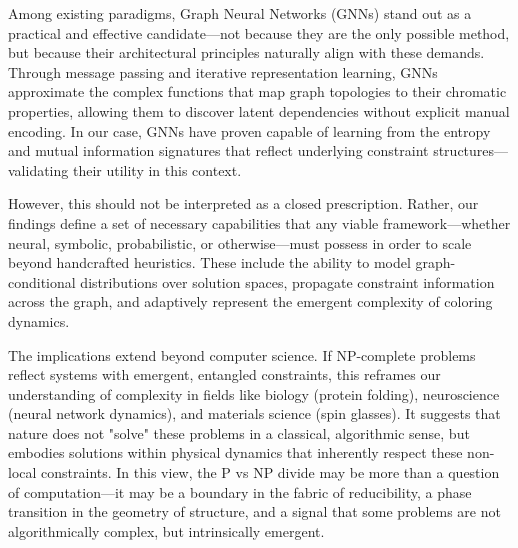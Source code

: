 \documentclass[12pt, letterpaper]{article}
\begin{document}
Among existing paradigms, Graph Neural Networks (GNNs) stand out as a practical and effective candidate—not because they are the only possible method, but because their architectural principles naturally align with these demands. Through message passing and iterative representation learning, GNNs approximate the complex functions that map graph topologies to their chromatic properties, allowing them to discover latent dependencies without explicit manual encoding. In our case, GNNs have proven capable of learning from the entropy and mutual information signatures that reflect underlying constraint structures—validating their utility in this context.

However, this should not be interpreted as a closed prescription. Rather, our findings define a set of necessary capabilities that any viable framework—whether neural, symbolic, probabilistic, or otherwise—must possess in order to scale beyond handcrafted heuristics. These include the ability to model graph-conditional distributions over solution spaces, propagate constraint information across the graph, and adaptively represent the emergent complexity of coloring dynamics.

The implications extend beyond computer science. If NP-complete problems reflect systems with emergent, entangled constraints, this reframes our understanding of complexity in fields like biology (protein folding), neuroscience (neural network dynamics), and materials science (spin glasses). It suggests that nature does not "solve" these problems in a classical, algorithmic sense, but embodies solutions within physical dynamics that inherently respect these non-local constraints. In this view, the P vs NP divide may be more than a question of computation—it may be a boundary in the fabric of reducibility, a phase transition in the geometry of structure, and a signal that some problems are not algorithmically complex, but intrinsically emergent.

\newpage
\end{document}
